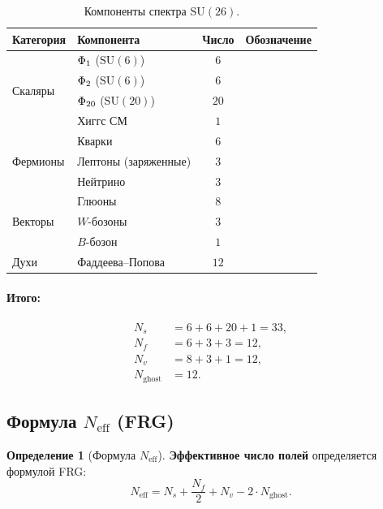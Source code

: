 \documentclass[11pt,a4paper]{article}
\newcommand{\SU}{\mathrm{SU}}
\newcommand{\Neff}{N_{\text{eff}}}
\newcommand{\Phione}{\Phi\textsubscript{1}}
\newcommand{\Phitwo}{\Phi\textsubscript{2}}
\newcommand{\Phitwenty}{\Phi\textsubscript{20}}
\theoremstyle{definition}
\newtheorem{definition}[theorem]{Определение}
\begin{document}
\begin{table}[htbp]
\centering
\caption{Компоненты спектра $\SU(26)$.}
\label{tab:su26-spectrum}
\begin{tabular}{llcl}
\toprule
Категория & Компонента & Число & Обозначение \\
\midrule
\multirow{4}{*}{Скаляры}
    & $\Phione$ ($\SU(6)$) & $6$ & \\
    & $\Phitwo$ ($\SU(6)$) & $6$ & \\
    & $\Phitwenty$ ($\SU(20)$) & $20$ & \\
    & Хиггс СМ & $1$ & \\
\midrule
\multirow{3}{*}{Фермионы}
    & Кварки & $6$ & \\
    & Лептоны (заряженные) & $3$ & \\
    & Нейтрино & $3$ & \\
\midrule
\multirow{3}{*}{Векторы}
    & Глюоны & $8$ & \\
    & $W$-бозоны & $3$ & \\
    & $B$-бозон & $1$ & \\
\midrule
Духи & Фаддеева--Попова & $12$ & \\
\bottomrule
\end{tabular}
\end{table}

\paragraph{Итого:}
\begin{align}
    N_s &= 6 + 6 + 20 + 1 = 33, \\
    N_f &= 6 + 3 + 3 = 12, \\
    N_v &= 8 + 3 + 1 = 12, \\
    N_{\text{ghost}} &= 12.
\end{align}

\subsection{Формула $\Neff$ (FRG)}
\label{subsec:neff-formula}

\begin{definition}[Формула $\Neff$]
\label{def:neff-formula}
\textbf{Эффективное число полей} определяется формулой FRG:
\begin{equation}
    \boxed{
    \Neff = N_s + \frac{N_f}{2} + N_v - 2 \cdot N_{\text{ghost}}.
    }
    \label{eq:neff-formula}
\end{equation}
\end{definition}
\end{document}
